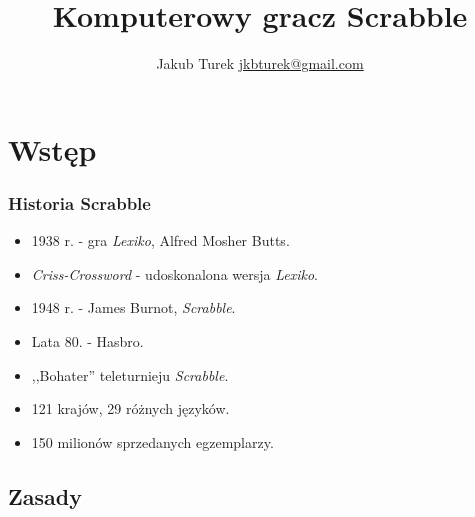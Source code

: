 \documentclass[10pt,a4paper]{beamer}
\author{\texorpdfstring{Jakub Turek \newline \href{mailto:jkbturek@gmail.com}{ jkbturek@gmail.com }}{Jakub Turek}}
\title{Komputerowy gracz Scrabble}
\institute{Wydział Elektroniki i Technik Informacyjnych}
\begin{document}
\begin{frame}
	\titlepage
\end{frame}

\section{Wstęp}

\begin{frame}
	\frametitle{Historia Scrabble}
	
	\begin{itemize}
		\item 1938 r. - gra \emph{Lexiko}, Alfred Mosher Butts.
		\item \emph{Criss-Crossword} - udoskonalona wersja \emph{Lexiko}.
		\item 1948 r. - James Burnot, \emph{Scrabble}.
		\item Lata 80. - Hasbro.
		\item ,,Bohater'' teleturnieju \emph{Scrabble}.
		\item 121 krajów, 29 różnych języków.
		\item 150 milionów sprzedanych egzemplarzy.
	\end{itemize}
\end{frame}

\subsection{Zasady}
\end{document}
